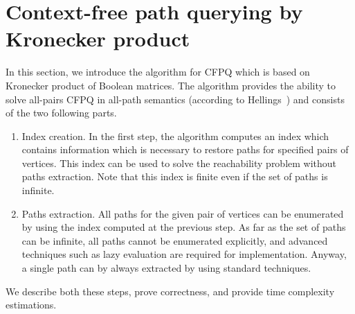 \section{Context-free path querying by Kronecker product}


In this section, we introduce the algorithm for CFPQ which is based on Kronecker product of Boolean matrices. 
The algorithm provides the ability to solve all-pairs CFPQ in all-path semantics (according to Hellings~\cite{hellingsPathQuerying}) and consists of the two following parts. 
\begin{enumerate}
\item Index creation. In the first step, the algorithm computes an index which contains information which is necessary to restore paths for specified pairs of vertices. This index can be used to solve the reachability problem without paths extraction. Note that this index is finite even if the set of paths is infinite.
\item Paths extraction. All paths for the given pair of vertices can be enumerated by using the index computed at the previous step. As far as the set of paths can be infinite, all paths cannot be enumerated explicitly, and advanced techniques such as lazy evaluation are required for implementation. Anyway, a single path can by always extracted by using standard techniques.
\end{enumerate}

We describe both these steps, prove correctness, and provide time complexity estimations. 

